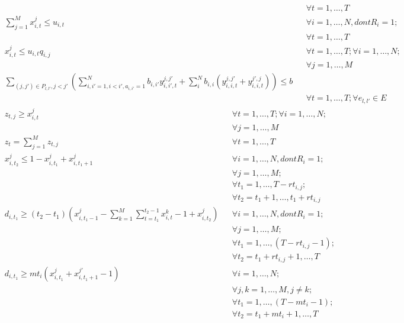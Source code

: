 \begin{align}
  & &&\forall t=1,\ldots,T \\
  &\sum_{j=1}^Mx_{i,t}^j \leq u_{i,t} 
   &&\forall i=1, \ldots, N, dont R_i=1; \nonumber \\
  & &&\forall t=1,\ldots,T \\
  &x_{i,t}^j \leq u_{i,t}q_{i,j} 
   &&\forall t=1,\ldots,T; \forall i=1, \ldots, N;    \nonumber \\
  & &&\forall j=1, \ldots, M \\
  &\sum_{(j,j\prime)\in P_{l,l\prime}, j<j\prime}(
   \sum_{i,i\prime=1, i<i\prime, a_{i,i\prime}=1}^N b_{i, i\prime}y_{i,i\prime,t}^{j,j\prime}
   + \sum_i^N b_{i, i}(y_{i,i,t}^{j,j\prime} + y_{i,i,t}^{j\prime,j})
  ) \leq b \nonumber \\
  & &&\forall t=1,\ldots,T; \forall e_{l,l\prime}\in E 
\end{align}
\clearpage
\begin{align}
  &z_{t,j} \geq x_{i,t}^j 
   &&\forall t=1,\ldots,T; \forall i=1, \ldots, N;    \nonumber \\
  & &&\forall j=1, \ldots, M \\  
  &z_{t} = \sum_{j=1}^Mz_{t,j} &&\forall t=1,\ldots,T \\
  &x_{i,t_2}^j \leq 1 - x_{i,t_1}^j + x_{i,t_1+1}^j  
   &&\forall i=1, \ldots, N, dont R_i=1;    \nonumber \\
  & &&\forall j=1, \ldots, M;  \nonumber \\
  & &&\forall t_1=1, \ldots, T-rt_{i,j}; \nonumber \\           
  & &&\forall t_2=t_1+1, \ldots, t_1+rt_{i,j} \\
  &d_{i,t_1} \geq (t_2 - t_1)(x_{i,t_1-1}^j - \sum_{k=1}^M\sum_{t=t_1}^{t_2-1}x_{i,t}^k - 1 + x_{i,t_2}^j)
   &&\forall i=1, \ldots, N, dont R_i=1;    \nonumber \\
  & &&\forall j=1, \ldots, M;  \nonumber \\
  & &&\forall t_1=1, \ldots, (T-rt_{i,j}-1); \nonumber \\           
  & &&\forall t_2=t_1+rt_{i,j}+1, \ldots, T \\
  &d_{i,t_1} \geq mt_i(x_{i,t_1}^j  + x_{i,t_1+1}^{j\prime} -1)  &&\forall i=1, \ldots, N;    \nonumber \\
  & &&\forall j,k=1, \ldots, M, j\neq k;  \nonumber \\
  & &&\forall t_1=1, \ldots, (T-mt_i-1); \nonumber \\           
  & &&\forall t_2=t_1+mt_i+1, \ldots, T
\end{align}
